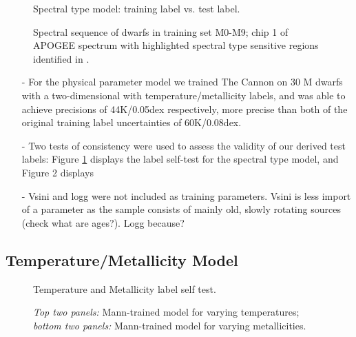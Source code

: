 \documentclass[modern]{aastex62}
\begin{document}
\begin{figure}[ht]
\caption{Spectral type model: training label vs. test label.} \label{fig:west_selftest}
\end{figure}


\begin{figure}[ht]
\caption{ Spectral sequence of dwarfs in training set M0-M9; chip 1 of APOGEE
spectrum with highlighted spectral type sensitive regions identified in \citealt{Desphande:2013}.} \label{fig:sp_sequence}
\end{figure}


\begin{enumerate}
\item[-] For the physical parameter model we trained The Cannon on 30 M dwarfs with a two-dimensional with temperature/metallicity labels, and was able to achieve precisions of 44K/0.05dex respectively, more precise than both of the original training label uncertainties of 60K/0.08dex.

\item[-] Two tests of consistency were used to assess the validity of our derived test labels: Figure \ref{fig:west_selftest} displays the label self-test for the spectral type model, and Figure 2 displays 

\item[-] Vsini and logg were not included as training parameters. Vsini is less import of a parameter as the sample consists of mainly old, slowly rotating sources (check what are ages?). Logg because?
\end{enumerate}


\subsection{Temperature/Metallicity Model}
\begin{figure}[ht]
\caption{Temperature and Metallicity label self test.} \label{fig:mann_selftest}
\end{figure}

\begin{figure}[ht]
\caption{\textit{Top two panels:} Mann-trained model for varying temperatures; \textit{bottom two panels:} Mann-trained model for varying metallicities. \color{red}{Things to add: line list and model - data difference}\color{black}} \label{fig:mann_demo}
\end{figure}
\end{document}
